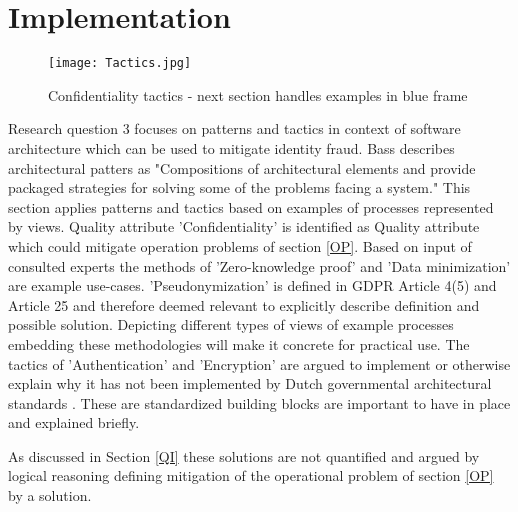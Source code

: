\chapter{Implementation}\label{s:Implementation}

\graphicspath{ {./images/} }
\begin{figure}
\centering
\label{fig:Tactics}
\texttt{[image: Tactics.jpg]}\\
\caption{Confidentiality tactics - next section handles examples in blue frame}
\end{figure}

Research question 3 focuses on patterns and tactics in context of software architecture which can be used to mitigate identity fraud. Bass \etal \cite{Bass2015SoftwareAI} describes architectural patters as "Compositions of architectural elements and provide packaged strategies for solving some of the problems facing a system." This section applies patterns and tactics based on examples of processes represented by views. Quality attribute 'Confidentiality' is identified as Quality attribute which could mitigate operation problems of section \ref{OP}. Based on input of consulted experts the methods of 'Zero-knowledge proof' and 'Data minimization' are example use-cases. 'Pseudonymization' is defined in GDPR Article 4(5) and Article 25 \cite{GDPR} and therefore deemed relevant to explicitly describe definition and possible solution. Depicting different types of views of example processes embedding these methodologies will make it concrete for practical use. The tactics of 'Authentication' and 'Encryption' are argued to implement or otherwise explain why it has not been implemented by Dutch governmental architectural standards \cite{NORA_PasToeOfLegUit}. These are standardized building blocks are important to have in place and explained briefly. 

As discussed in Section \ref{QI} these solutions are not quantified and argued by logical reasoning defining mitigation of the operational problem of section \ref{OP} by a solution.


